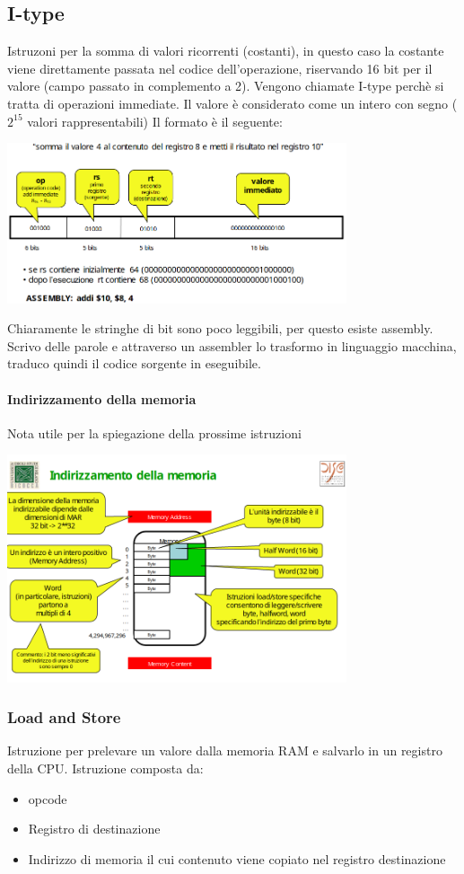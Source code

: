 \documentclass[12pt, a4paper, openany]{book}
\begin{document}
\subsection{I-type}
Istruzoni per la somma di valori ricorrenti (costanti), in questo caso la costante viene direttamente
passata nel codice dell'operazione, riservando 16 bit per il valore (campo passato in complemento a 2).
Vengono chiamate I-type perchè si tratta di operazioni immediate.
Il valore è considerato come un intero con segno ($2^15$ valori rappresentabili)
Il formato è il seguente:
\begin{center}
    \includegraphics[width=100mm, scale=0.5]{I-type format.png}
\end{center}
Chiaramente le stringhe di bit sono poco leggibili, per questo esiste assembly.
Scrivo delle parole e attraverso un assembler lo trasformo in linguaggio macchina, traduco
quindi il codice sorgente in eseguibile.
\paragraph{Indirizzamento della memoria} Nota utile per la spiegazione della prossime istruzioni
\begin{center}
    \includegraphics[width=100mm, scale=0.5]{assembly indirizzamento memoria.png}
\end{center}

\subsubsection*{Load and Store}
Istruzione per prelevare un valore dalla memoria RAM e salvarlo in un registro della CPU.
Istruzione composta da:
\begin{itemize}
    \item opcode
    \item Registro di destinazione
    \item Indirizzo di memoria il cui contenuto viene copiato nel registro destinazione
\end{itemize}
\end{document}

